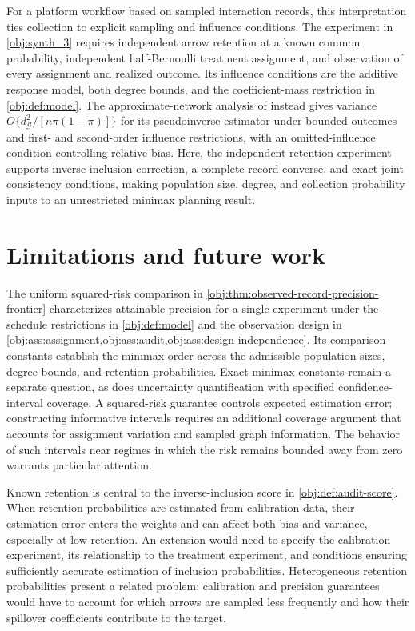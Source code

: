 \documentclass[11pt]{article}
\begin{document}
For a platform workflow based on sampled interaction records, this interpretation ties collection to explicit sampling and influence conditions. The experiment in \cref{obj:synth_3} requires independent arrow retention at a known common probability, independent half-Bernoulli treatment assignment, and observation of every assignment and realized outcome. Its influence conditions are the additive response model, both degree bounds, and the coefficient-mass restriction in \cref{obj:def:model}. The approximate-network analysis of \citet[Assumptions 1--3; Theorems 1--2; Lemma 2]{JiangDengWangWang2024ApproximateNetworks} instead gives variance \(O\{d_{\mathcal G}^2/[n\pi(1-\pi)]\}\) for its pseudoinverse estimator under bounded outcomes and first- and second-order influence restrictions, with an omitted-influence condition controlling relative bias. Here, the independent retention experiment supports inverse-inclusion correction, a complete-record converse, and exact joint consistency conditions, making population size, degree, and collection probability inputs to an unrestricted minimax planning result.


\section{Limitations and future work}

The uniform squared-risk comparison in \cref{obj:thm:observed-record-precision-frontier} characterizes attainable precision for a single experiment under the schedule restrictions in \cref{obj:def:model} and the observation design in \cref{obj:ass:assignment,obj:ass:audit,obj:ass:design-independence}. Its comparison constants establish the minimax order across the admissible population sizes, degree bounds, and retention probabilities. Exact minimax constants remain a separate question, as does uncertainty quantification with specified confidence-interval coverage. A squared-risk guarantee controls expected estimation error; constructing informative intervals requires an additional coverage argument that accounts for assignment variation and sampled graph information. The behavior of such intervals near regimes in which the risk remains bounded away from zero warrants particular attention.

Known retention is central to the inverse-inclusion score in \cref{obj:def:audit-score}. When retention probabilities are estimated from calibration data, their estimation error enters the weights and can affect both bias and variance, especially at low retention. An extension would need to specify the calibration experiment, its relationship to the treatment experiment, and conditions ensuring sufficiently accurate estimation of inclusion probabilities. Heterogeneous retention probabilities present a related problem: calibration and precision guarantees would have to account for which arrows are sampled less frequently and how their spillover coefficients contribute to the target.
\end{document}
